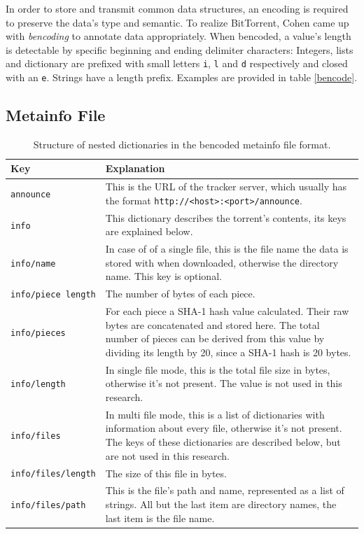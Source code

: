 \documentclass[10pt, a4paper, twoside, headsepline]{scrbook}
\renewcommand{\_}{\origunderscore\allowbreak}
\begin{document}
In order to store and transmit common data structures, an encoding is required to preserve the data's type and semantic. To realize BitTorrent, Cohen came up with \emph{bencoding} to annotate data appropriately. When bencoded, a value's length is detectable by specific beginning and ending delimiter characters: Integers, lists and dictionary are prefixed with small letters \texttt{i}, \texttt{l} and \texttt{d} respectively and closed with an \texttt{e}. Strings have a length prefix. Examples are provided in table \ref{bencode}.

\subsection{Metainfo File}
\begin{table}
\centering
\begin{tabularx}{\textwidth}{lX}
\toprule
Key & Explanation \\
\midrule
\texttt{announce} & This is the URL of the tracker server, which usually has the format \nolinkurl{http://<host>:<port>/announce}. \\
\texttt{info} & This dictionary describes the torrent's contents, its keys are explained below. \\
\texttt{info/name} & In case of of a single file, this is the file name the data is stored with when downloaded, otherwise the directory name. This key is optional. \\
\texttt{info/piece length} & The number of bytes of each piece. \\
\texttt{info/pieces} & For each piece a SHA-1 hash value calculated. Their raw bytes are concatenated and stored here. The total number of pieces can be derived from this value by dividing its length by 20, since a SHA-1 hash is 20 bytes. \\
\texttt{info/length} & In single file mode, this is the total file size in bytes, otherwise it's not present. The value is not used in this research. \\
\texttt{info/files} & In multi file mode, this is a list of dictionaries with information about every file, otherwise it's not present. The keys of these dictionaries are described below, but are not used in this research. \\
\texttt{info/files/length} & The size of this file in bytes. \\
\texttt{info/files/path} & This is the file's path and name, represented as a list of strings. All but the last item are directory names, the last item is the file name. \\
\bottomrule
\end{tabularx}
\caption[Structure of the metainfo file format]{Structure of nested dictionaries in the bencoded metainfo file format.}
\label{metainfo-file}
\end{table}
\end{document}

